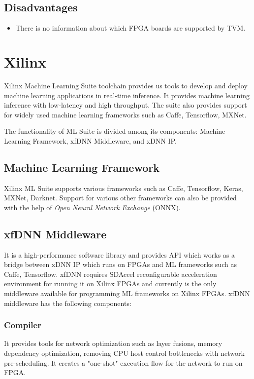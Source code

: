 \documentclass[titlepage]{report}
\begin{document}
 \subsection{Disadvantages}
 \begin{itemize}
 \item There is no information about which FPGA boards are supported by TVM.
 \end{itemize}

\section{Xilinx}
Xilinx Machine Learning Suite toolchain provides us tools to develop and deploy machine learning applications in real-time inference. It provides machine learning inference with low-latency and high throughput. The suite also provides support for widely used machine learning frameworks such as Caffe, Tensorflow, MXNet.

The functionality of ML-Suite is divided among its components: Machine Learning Framework, xfDNN Middleware, and xDNN IP.

\subsection{Machine Learning Framework}
Xilinx ML Suite supports various frameworks such as Caffe, Tensorflow, Keras, MXNet, Darknet. Support for various other frameworks can also be provided with the help of \textit{Open Neural Network Exchange} (ONNX).

\subsection{xfDNN Middleware}
It is a high-performance software library and provides API which works as a bridge between xDNN IP which runs on FPGAs and ML frameworks such as Caffe, Tensorflow. xfDNN requires SDAccel reconfigurable acceleration environment for running it on Xilinx FPGAs and currently is the only middleware available for programming ML frameworks on Xilinx FPGAs. xfDNN middleware has the following components:
\subsubsection{Compiler}

It provides tools for network optimization such as layer fusions, memory dependency optimization, removing CPU host control bottlenecks with network pre-scheduling. It creates a "one-shot" execution flow for the network to run on FPGA.
\end{document}
